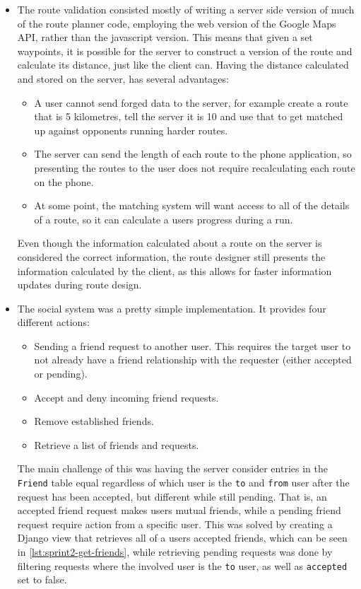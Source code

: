 \begin{itemize}
 \item The route validation consisted mostly of writing a server side version of much of the route planner code, employing the web version of the Google Maps \ac{API}, rather than the javascript version. This means that given a set waypoints, it is possible for the server to construct a version of the route and calculate its distance, just like the client can. Having the distance calculated and stored on the server, has several advantages:
 \begin{itemize}
  \item A user cannot send forged data to the server, for example create a route that is 5 kilometres, tell the server it is 10 and use that to get matched up against opponents running harder routes.
  \item The server can send the length of each route to the phone application, so presenting the routes to the user does not require recalculating each route on the phone.
  \item At some point, the matching system will want access to all of the details of a route, so it can calculate a users progress during a run.
 \end{itemize}
 Even though the information calculated about a route on the server is considered the correct information, the route designer still presents the information calculated by the client, as this allows for faster information updates during route design.
 \item The social system was a pretty simple implementation. It provides four different actions:
 \begin{itemize}
  \item Sending a friend request to another user. This requires the target user to not already have a friend relationship with the requester (either accepted or pending).
  \item Accept and deny incoming friend requests.
  \item Remove established friends.
  \item Retrieve a list of friends and requests.
 \end{itemize}
 The main challenge of this was having the server consider entries in the \texttt{Friend} table equal regardless of which user is the \texttt{to} and \texttt{from} user after the request has been accepted, but different while still pending. That is, an accepted friend request makes users mutual friends, while a pending friend request require action from a specific user. This was solved by creating a Django view that retrieves all of a users accepted friends, which can be seen in \autoref{lst:sprint2-get-friends}, while retrieving pending requests was done by filtering requests where the involved user is the \texttt{to} user, as well as \texttt{accepted} set to false.
\end{itemize}

